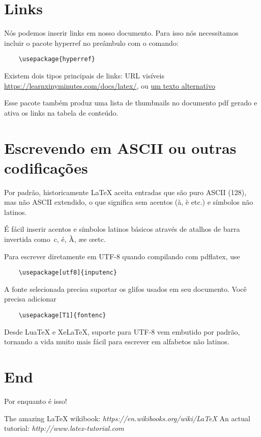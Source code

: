 \documentclass[12pt]{article}
\begin{document}
\section{Links}
Nós podemos inserir links em nosso documento. Para isso nós necessitamos incluir
o pacote hyperref no preâmbulo com o comando:
\begin{verbatim} 
    \usepackage{hyperref}
\end{verbatim}

Existem dois tipos principais de links: URL visíveis \\
\url{https://learnxinyminutes.com/docs/latex/}, ou
\href{https://learnxinyminutes.com/docs/latex/}{um texto alternativo}

Esse pacote também produz uma lista de thumbnails no documento pdf gerado e
ativa os links na tabela de conteúdo.

\section{Escrevendo em ASCII ou outras codificações}

Por padrão, historicamente LaTeX aceita entradas que são puro ASCII (128),
mas não ASCII extendido, o que significa sem acentos (à, è etc.) e símbolos não latinos.

É fácil inserir acentos e símbolos latinos básicos através de atalhos de barra invertida
como \,c, \'e, \`A, \ae e \oe etc.  %

Para escrever diretamente em UTF-8 quando compilando com pdflatex, use
\begin{verbatim}
    \usepackage[utf8]{inputenc}
\end{verbatim}
A fonte selecionada precisa suportar os glifos usados em seu documento. Você precisa adicionar
\begin{verbatim}
    \usepackage[T1]{fontenc}
\end{verbatim}

Desde LuaTeX e XeLaTeX, suporte para UTF-8 vem embutido por padrão, tornando a vida muito
mais fácil para escrever em alfabetos não latinos.

\section{End}

Por enquanto é isso!

\begin{thebibliography}{1}
   The amazing \LaTeX{} wikibook: {\em 
https://en.wikibooks.org/wiki/LaTeX}
   An actual tutorial: {\em http://www.latex-tutorial.com}
\end{thebibliography}

\end{document}
